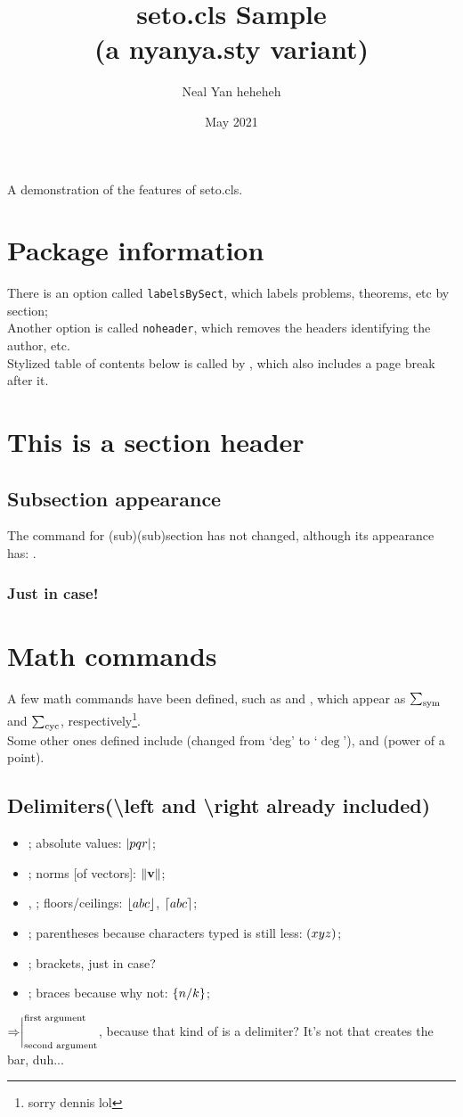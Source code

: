 \documentclass[labelsBySect]{seto}
\title{seto.cls Sample\\(a nyanya.sty variant)}
\author{Neal Yan heheheh}
\date{May 2021}
\begin{document}
\maketitle
A demonstration of the features of seto.cls.
\section*{Package information}
There is an option called \texttt{labelsBySect}, which labels problems, theorems, etc by section;\\
Another option is called \texttt{noheader}, which removes the headers identifying the author, etc.\\
Stylized table of contents below is called by , which also includes a page break after it.
\toc 
\section{This is a section header}
\subsection{Subsection appearance}
The command for (sub)(sub)section has not changed, although its appearance has: .
\subsubsection{Just in case!}
\section{Math commands}
A few math commands have been defined, such as  and , which appear as $\symsum$ and $\cycsum$, respectively\footnote{sorry dennis lol}.\\
Some other ones defined include (changed from `deg' to `$\deg$'), and (power of a point).
\subsection{Delimiters(\textbackslash left and \textbackslash right already included)}
\begin{itemize}
    \item{}; absolute values: $\abs{pqr}$;
    \item{}; norms [of vectors]: $\norm{\textbf{v}}$;
    \item{}, ; floors/ceilings: $\floor{abc}$, $\ceil{abc}$;
    \item{}; parentheses because characters typed is still less: $\parenth{xyz}$;
    \item{}; brackets, just in case?
    \item{}; braces because why not: $\braces{n/k}$;
\end{itemize}
$\Rightarrow\evalat[\text{first argument}]{\text{second argument}}$, because that kind of is a delimiter? It's not  that creates the bar, duh...
\end{document}

